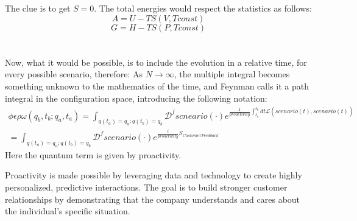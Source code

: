 \documentclass{article}
\begin{document}
The clue is to get $S = 0$.
The total energies would respect the statistics as follows:
\begin{equation}
    A = U - TS (V,T const)
\end{equation}
\begin{equation}
    G = H - TS (P, T const)
\end{equation}
\\\\
Now, what it would be possible, is to include the evolution in a relative time, for every possible scenario, therefore:
As $N \to \infty$, the multiple integral becomes something unknown to the mathematics of the time, and Feynman calls it a path integral in the configuration space, introducing the following notation:
\begin{align}
\phi\epsilon\rho\omega(q_b, t_b; q_a, t_a) = \int_{q(t_a)=q_a; q(t_b)=q_b} \mathcal{D}^f scneario(\cdot) e^{\frac{1}{proactivity} \int_{t_a}^{t_b} dt \mathcal{L}(scenario(t), \dot{scenario}(t))}\\ = \int_{q(t_a)=q_a; q(t_b)=q_b} \mathcal{D}^f scenario(\cdot) e^{\frac{i}{proactivity} S_{CustomerFeedback}} 
\end{align}
Here the quantum term is given by proactivity. 

Proactivity is made possible by leveraging data and technology to create highly personalized, predictive interactions. The goal is to build stronger customer relationships by demonstrating that the company understands and cares about the individual's specific situation. 
\end{document}
